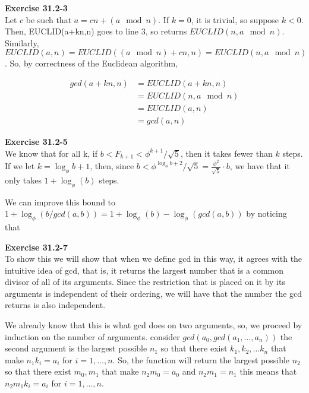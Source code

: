 \documentclass{article}
\begin{document}
\noindent\textbf{Exercise 31.2-3}\\
Let $c$ be such that $a = cn +(a\mod n)$. If $k=0$, it is trivial, so suppose $k<0$. Then, EUCLID(a+kn,n) goes to line 3, so returns $EUCLID(n, a\mod n)$. Similarly, $EUCLID(a,n) = EUCLID((a\mod n) + cn, n) = EUCLID(n,a\mod n)$. So, by correctness of the Euclidean algorithm,

\begin{align*}
gcd(a+kn,n) &= EUCLID(a+kn,n)\\
& =  EUCLID(n,a\mod n)\\
& = EUCLID(a,n)\\
& = gcd(a,n)
\end{align*}



\noindent\textbf{Exercise 31.2-5}\\
We know that for all k, if $b < F_{k+1} < \phi^{k+1}/\sqrt{5}$, then it takes fewer than $k$ steps. If we let $k = \log_\phi{b} + 1$, then, since $b < \phi^{\log_\phi{b} + 2}/\sqrt{5} = \frac{\phi^2}{\sqrt{5}} \cdot b$, we have that it only takes $1+\log_\phi(b)$ steps.

We can improve this bound to $1 + \log_{\phi}(b/gcd(a,b)) = 1+ \log_{\phi}(b) - \log_{\phi}(gcd(a,b))$ by noticing that 



\noindent\textbf{Exercise 31.2-7}\\

To show this we will show that when we define gcd in this way, it agrees with the intuitive idea of gcd, that is, it returns the largest number that is a common divisor of all of its arguments. Since the restriction that is placed on it by its arguments is independent of their ordering, we will have that the number the gcd returns is also independent.

We already know that this is what gcd does on two arguments, so, we proceed by induction on the number of arguments. consider $gcd(a_0,gcd(a_1, \ldots,a_n))$ the second argument is the largest possible $n_1$ so that there exist $k_1,k_2, \ldots k_n$ that make $n_1 k_i = a_i$ for $i=1,\ldots,n$. So, the function will return the largest possible $n_2$ so that there exist $m_0,m_1$ that make $n_2 m_0 = a_0$ and $n_2 m_1 = n_1$ this means that $n_2 m_1 k_i = a_i$ for $i=1,\ldots,n$.
\end{document}
